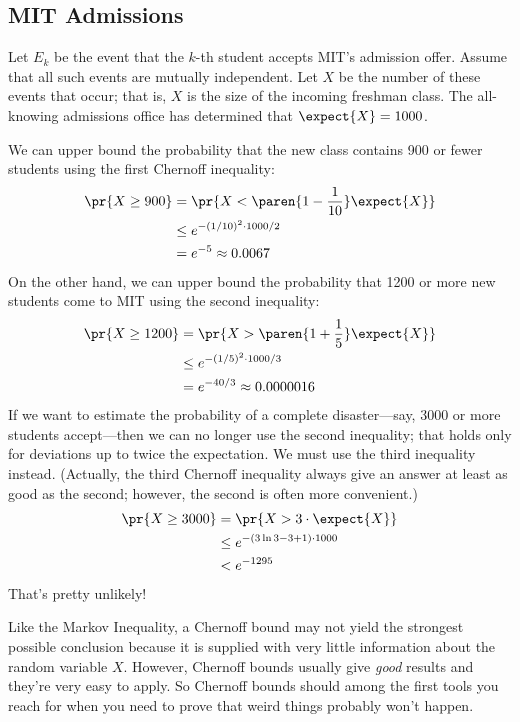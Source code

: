 \begin{editingnotes}
\subsection{MIT Admissions}

Let $E_k$ be the event that the $k$-th student accepts MIT's admission
offer.  Assume that all such events are mutually independent.  Let $X$
be the number of these events that occur; that is, $X$ is the size of
the incoming freshman class.  The all-knowing admissions office has
determined that $\expect{X} = 1000$.

We can upper bound the probability that the new class contains 900 or
fewer students using the first Chernoff inequality:
%
\begin{align*}
\pr{X \geq 900}
    & = \pr{X < \paren{1 - \frac{1}{10}} \expect{X}} \\
    & \leq e^{- (1/10)^2 \cdot 1000 / 2} \\
    & = e^{-5} \approx 0.0067
\end{align*}
%
On the other hand, we can upper bound the probability that 1200 or
more new students come to MIT using the second inequality:
%
\begin{align*}
\pr{X \geq 1200}
    & = \pr{X > \paren{1 + \frac{1}{5}} \expect{X}} \\
    & \leq e^{- (1/5)^2 \cdot 1000 / 3} \\
    & = e^{-40/3} \approx 0.0000016
\end{align*}
%
If we want to estimate the probability of a complete disaster---say,
3000 or more students accept---then we can no longer use the second
inequality; that holds only for deviations up to twice the
expectation.  We must use the third inequality instead.  (Actually,
the third Chernoff inequality always give an answer at least as good
as the second; however, the second is often more convenient.)
%
\begin{align*}
\pr{X \geq 3000}
    & = \pr{X > 3 \cdot \expect{X}} \\
    & \leq e^{-(3 \ln 3 - 3 + 1) \cdot 1000} \\
    & < e^{-1295}
\end{align*}
%
That's pretty unlikely!  

Like the Markov Inequality, a Chernoff bound may not yield the
strongest possible conclusion because it is supplied with very little
information about the random variable $X$.  However, Chernoff bounds
usually give \textit{good} results and they're very easy to apply.  So
Chernoff bounds should among the first tools you reach for when you
need to prove that weird things probably won't happen.


\end{editingnotes}
